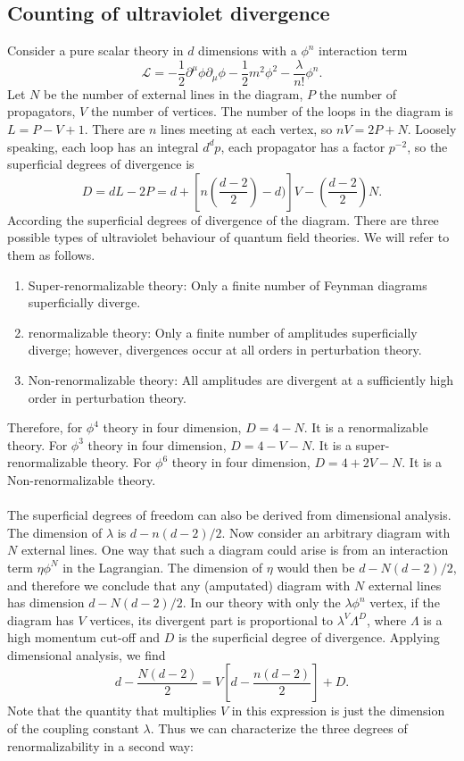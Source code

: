 \subsection{Counting of ultraviolet divergence}
Consider a pure scalar theory in $d$ dimensions with a $\phi^n$ interaction term
\[\mathcal{L} = -\frac{1}{2} \partial^{\mu} \phi \partial_{\mu} \phi -\frac{1}{2}m^2 \phi^2 - \frac{\lambda}{n!}\phi^n.\]
Let $N$ be the number of external lines in the diagram, $P$ the number of propagators, $V$ the number of vertices. The number of the loops in the diagram is $L=P-V+1$.  There are $n$ lines meeting at each vertex, so $nV = 2P+N$. Loosely speaking, each loop has an integral $d^d p$, each propagator has a factor $p^{-2}$, so the superficial degrees of divergence is
\[D = dL - 2P = d + [n(\frac{d-2}{2})-d)]V - (\frac{d-2}{2})N.\]
According the superficial degrees of divergence of the diagram. There are three possible types of ultraviolet behaviour of quantum field theories. We will refer to them as follows.

\begin{enumerate}
\item Super-renormalizable theory: Only a finite number of Feynman diagrams superficially diverge.
\item renormalizable theory: Only a finite number of amplitudes superficially diverge; however, divergences
occur at all orders in perturbation theory. 
\item Non-renormalizable theory: All amplitudes are divergent at a sufficiently high order in perturbation
theory.
\end{enumerate}
\noindent
Therefore, for $\phi^4$ theory in four dimension, $D = 4 - N$. It is a renormalizable theory. For $\phi^3$ theory in four dimension, $D = 4 - V -N$. It is a super-renormalizable theory. For $\phi^6$ theory in four dimension, $D = 4 + 2V -N$. It is a Non-renormalizable theory. 
\\ \\
The superficial degrees of freedom can also be derived from dimensional analysis. The dimension of $\lambda$ is $d - {n(d-2)}/{2}$. Now consider an arbitrary diagram with $N$ external lines. One way that such a diagram could arise is from an interaction term $\eta \phi^N$ in the Lagrangian. The dimension of $\eta$ would then be $d - {N(d-2)}/{2}$, and therefore we conclude that any (amputated) diagram with $N$ external lines has dimension $d - {N(d-2)}/{2}$. 
In our theory with only the $\lambda \phi^n$ vertex, if the diagram has $V$ vertices, its divergent part is proportional to $\lambda^V \Lambda^D$, where $\Lambda$ is a high momentum cut-off and $D$ is the superficial degree of divergence.  Applying dimensional analysis, we find
\[d - \frac{N(d-2)}{2} = V[d - \frac{n(d-2)}{2}] + D.\]
Note that the quantity that multiplies $V$ in this expression is just the dimension of the coupling constant $\lambda$. Thus we can characterize the three degrees of renormalizability in a second way:

